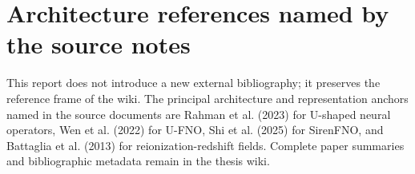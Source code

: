 \documentclass[11pt,a4paper]{article}
\begin{document}
\section{Architecture references named by the source notes}

This report does not introduce a new external bibliography; it preserves the
reference frame of the wiki. The principal architecture and representation
anchors named in the source documents are Rahman et al. (2023) for U-shaped
neural operators, Wen et al. (2022) for U-FNO, Shi et al. (2025) for
SirenFNO, and Battaglia et al. (2013) for reionization-redshift fields.
Complete paper summaries and bibliographic metadata remain in the thesis wiki.
\end{document}
